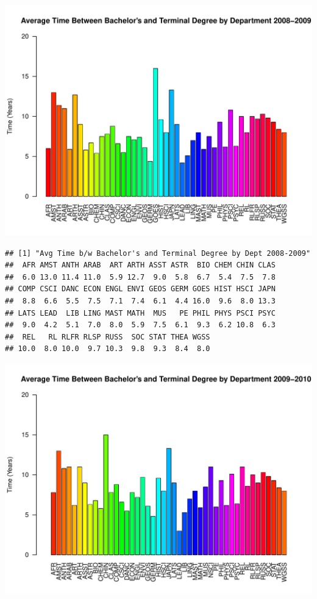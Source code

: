 \documentclass[12pt,a4paper]{article}\usepackage[]{graphicx}\usepackage[]{color}
\makeatletter
\def\maxwidth{ %
  \ifdim\Gin@nat@width>\linewidth
    \linewidth
  \else
    \Gin@nat@width
  \fi
}
\newenvironment{kframe}{%
 \def\at@end@of@kframe{}%
 \ifinner\ifhmode%
  \def\at@end@of@kframe{\end{minipage}}%
  \begin{minipage}{\columnwidth}%
 \fi\fi%
 \def\FrameCommand##1{\hskip\@totalleftmargin \hskip-\fboxsep
 \colorbox{shadecolor}{##1}\hskip-\fboxsep
     \hskip-\linewidth \hskip-\@totalleftmargin \hskip\columnwidth}%
 \MakeFramed {\advance\hsize-\width
   \@totalleftmargin\z@ \linewidth\hsize
   \@setminipage}}%
 {\par\unskip\endMakeFramed%
 \at@end@of@kframe}
\newenvironment{knitrout}{}{} %
\theoremstyle{definition}
\makeatother
\begin{document}
\begin{knitrout}
\includegraphics[width=\maxwidth]{figure/unnamed-chunk-12-5} 
\begin{kframe}\begin{verbatim}
## [1] "Avg Time b/w Bachelor's and Terminal Degree by Dept 2008-2009"
##  AFR AMST ANTH ARAB  ART ARTH ASST ASTR  BIO CHEM CHIN CLAS 
##  6.0 13.0 11.4 11.0  5.9 12.7  9.0  5.8  6.7  5.4  7.5  7.8 
## COMP CSCI DANC ECON ENGL ENVI GEOS GERM GOES HIST HSCI JAPN 
##  8.8  6.6  5.5  7.5  7.1  7.4  6.1  4.4 16.0  9.6  8.0 13.3 
## LATS LEAD  LIB LING MAST MATH  MUS   PE PHIL PHYS PSCI PSYC 
##  9.0  4.2  5.1  7.0  8.0  5.9  7.5  6.1  9.3  6.2 10.8  6.3 
##  REL   RL RLFR RLSP RUSS  SOC STAT THEA WGSS 
## 10.0  8.0 10.0  9.7 10.3  9.8  9.3  8.4  8.0
\end{verbatim}
\end{kframe}
\includegraphics[width=\maxwidth]{figure/unnamed-chunk-12-6} 

\end{knitrout}
\end{document}
